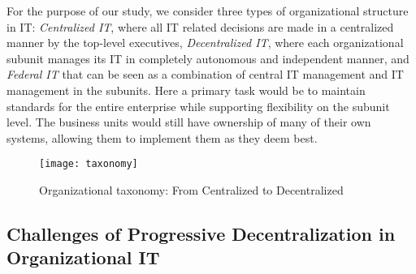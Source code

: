 For the purpose of our study, we consider three types of organizational structure in IT: \textit{Centralized IT}, where all IT related decisions are made in a centralized manner by the top-level executives, \textit{Decentralized IT}, where each organizational subunit manages its IT in completely autonomous and independent manner,  and \textit{Federal IT} that can be seen as a combination of central IT management and IT management in the subunits. Here a primary task  would be to maintain standards for the entire enterprise while supporting flexibility on the subunit level. The business units would still have ownership of many of their own systems, allowing them to implement them as they deem best. 







\begin{figure}
\centering
\texttt{[image: taxonomy]}
\caption{Organizational taxonomy: From Centralized to Decentralized}
\label{fig:taxonomy}
\end{figure}

\subsection{Challenges of Progressive Decentralization in Organizational IT}
\label{sec:challenge}

